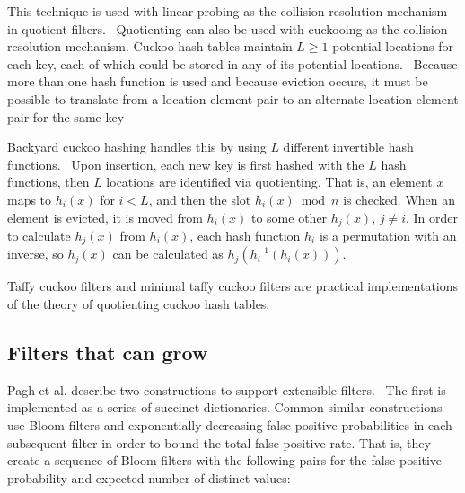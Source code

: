 \documentclass[letterpaper,twocolumn,10pt]{article}
\newcommand{\etal}{et al.}
\begin{document}
This technique is used with linear probing as the collision resolution mechanism in quotient filters.~\cite{quotient-filter}
Quotienting can also be used with cuckooing as the collision resolution mechanism.
Cuckoo hash tables maintain $L \ge 1$ potential locations for each key, each of which could be stored in any of its potential locations.~\cite{cuckoo-journal}
Because more than one hash function is used and because eviction occurs, it must be possible to translate from a location-element pair to an alternate location-element pair for the same key



Backyard cuckoo hashing handles this by using $L$ different invertible hash functions.~\cite{backyard}
Upon insertion, each new key is first hashed with the $L$ hash functions, then $L$ locations are identified via quotienting.
That is, an element $x$ maps to $h_i(x)$ for $i < L$, and then the slot $h_i(x) \bmod n$ is checked.
When an element is evicted, it is moved from $h_i(x)$ to some other $h_j(x)$, $j \ne i$.
In order to calculate $h_j(x)$ from $h_i(x)$, each hash function $h_i$ is a permutation with an inverse, so $h_j(x)$ can be calculated as $h_j(h_i^{-1}(h_i(x)))$.

Taffy cuckoo filters and minimal taffy cuckoo filters are practical implementations of the theory of quotienting cuckoo hash tables.


\subsection{Filters that can grow}

Pagh \etal{} describe two constructions to support extensible filters.~\cite{psw}
The first is implemented as a series of succinct dictionaries.
Common similar constructions use Bloom filters and exponentially decreasing false positive probabilities in each subsequent filter in order to bound the total false positive rate.
That is, they create a sequence of Bloom filters with the following pairs for the false positive probability and expected number of distinct values:
\end{document}
